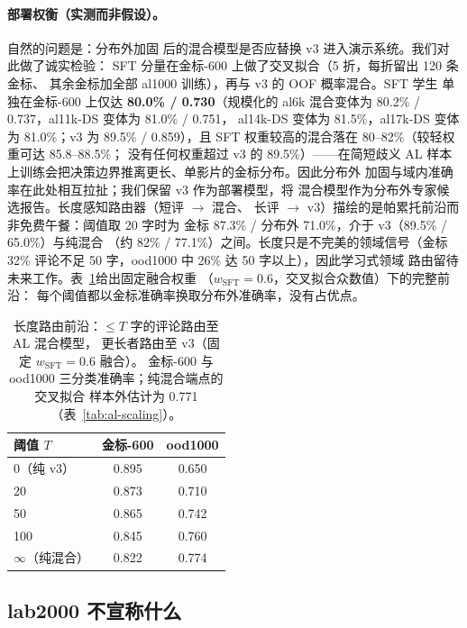 \documentclass[11pt,a4paper]{article}
\begin{document}
\paragraph{部署权衡（实测而非假设）。} 自然的问题是：分布外加固
后的混合模型是否应替换 v3 进入演示系统。我们对此做了诚实检验：
SFT 分量在金标-600 上做了交叉拟合（5 折，每折留出 120 条金标、
其余金标加全部 al1000 训练），再与 v3 的 OOF 概率混合。SFT 学生
单独在金标-600 上仅达 \textbf{80.0\% / 0.730}（规模化的
al6k 混合变体为 80.2\% / 0.737，al11k-DS 变体为 81.0\% / 0.751，
al14k-DS 变体为 81.5\%，al17k-DS 变体为 81.0\%；v3 为 89.5\% / 0.859），且
SFT 权重较高的混合落在 80--82\%（较轻权重可达 85.8--88.5\%；
没有任何权重超过 v3 的 89.5\%）——在简短歧义 AL
样本上训练会把决策边界推离更长、单影片的金标分布。因此分布外
加固与域内准确率在此处相互拉扯；我们保留 v3 作为部署模型，将
混合模型作为分布外专家候选报告。长度感知路由器（短评 $\to$ 混合、
长评 $\to$ v3）描绘的是帕累托前沿而非免费午餐：阈值取 20 字时为
金标 87.3\% / 分布外 71.0\%，介于 v3（89.5\% / 65.0\%）与纯混合
（约 82\% / 77.1\%）之间。长度只是不完美的领域信号（金标 32\%
评论不足 50 字，ood1000 中 26\% 达 50 字以上），因此学习式领域
路由留待未来工作。表~\ref{tab:router}给出固定融合权重
（$w_{\mathrm{SFT}}{=}0.6$，交叉拟合众数值）下的完整前沿：
每个阈值都以金标准确率换取分布外准确率，没有占优点。

\begin{table}[H]
\centering\footnotesize
\caption{长度路由前沿：$\le T$ 字的评论路由至 AL 混合模型，
更长者路由至 v3（固定 $w_{\mathrm{SFT}}{=}0.6$ 融合）。
金标-600 与 ood1000 三分类准确率；纯混合端点的交叉拟合
样本外估计为 0.771（表~\ref{tab:al-scaling}）。}
\label{tab:router}
\begin{tabular}{lcc}
\toprule
阈值 $T$ & 金标-600 & ood1000 \\
\midrule
0（纯 v3）      & 0.895 & 0.650 \\
20               & 0.873 & 0.710 \\
50               & 0.865 & 0.742 \\
100              & 0.845 & 0.760 \\
$\infty$（纯混合） & 0.822 & 0.774 \\
\bottomrule
\end{tabular}
\end{table}

\subsection{lab2000 不宣称什么}
\label{sec:lab2000-caveats}
\end{document}
